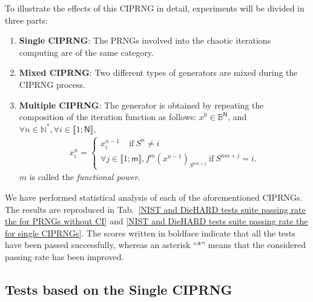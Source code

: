 To illustrate the effects of this CIPRNG in detail, experiments will be divided in three parts:
\begin{enumerate}
  \item \textbf{Single CIPRNG}: The PRNGs involved into the chaotic iterations computing are of the same category.
  \item \textbf{Mixed CIPRNG}: Two different types of generators are mixed during the CIPRNG process.
  \item \textbf{Multiple CIPRNG}: The generator is obtained by repeating the composition of the iteration function as follows: $x^0\in \mathds{B}^{\mathsf{N}}$, and $\forall n\in \mathds{N}^{\ast },\forall i\in \llbracket1;\mathsf{N}\rrbracket,$
\begin{equation}
\begin{array}{l}
x_i^n=\left\{
\begin{array}{l}
x_i^{n-1}~~~~~\text{if}~S^n\neq i \\
\forall j\in \llbracket1;\mathsf{m}\rrbracket,f^m(x^{n-1})_{S^{nm+j}}~\text{if}~S^{nm+j}=i.\end{array} \right. \end{array}
\end{equation}
$m$ is called the \emph{functional power}.
\end{enumerate}


We have performed statistical analysis of each of the aforementioned CIPRNGs.
The results are reproduced in Tab.~\ref{NIST and DieHARD tests suite passing rate the for PRNGs without CI} and \ref{NIST and DieHARD tests suite passing rate the for single CIPRNGs}.
The scores written in boldface indicate that all the tests have been passed successfully, whereas an asterisk ``*'' means that the considered passing rate has been improved.
\subsection{Tests based on the Single CIPRNG}

